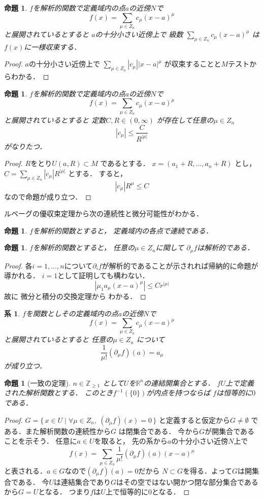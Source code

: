 \documentclass[leqno, a4paper, 12pt]{jsarticle}
\newtheorem{prop}[thm]{命題}
\newtheorem{cor}[thm]{系}
\newcommand{\zz}{\mathbb{Z}}
\newcommand{\rr}{\mathbb{R}}
\begin{document}
\begin{prop}
$f$を解析的関数で定義域内の点$a$の近傍$N$で
\[
f(x)=\sum_{\mu\in Z_n}c_{\mu}(x-a)^{\mu}
\]
と展開されているとすると
$a$の十分小さい近傍上で
級数
$\sum_{\mu\in Z_n}c_{\mu}(x-a)^{\mu}
$
は$f(x)$に一様収束する．
\end{prop}
\begin{proof}
$a$の十分小さい近傍上で
$\sum_{\mu\in Z_n}|c_{\mu}||x-a|^{\mu}$
が収束することと$M$テストからわかる．
\end{proof}



\begin{prop}
$f$を解析的関数で定義域内の点$a$の近傍$N$で
\[
f(x)=\sum_{\mu\in Z_n}c_{\mu}(x-a)^{\mu}
\]
と展開されているとすると
定数$C, R\in (0, \infty)$
が存在して任意の$\mu\in Z_n$
\[
|c_{\mu}|\le \frac{C}{R^{|\mu|}}
\]
がなりたつ．
\end{prop}
\begin{proof}
$R$をとり$U(a, R)\subset M$
であるとする．
$x=(a_1+R, \dots, a_n+R)$
とし，
$C=\sum_{\mu\in Z_n}|c_{\mu}|R^{|\mu|}$
とする．
すると，
\[
|c_{\mu}|R^{\mu}\le C
\]
なので命題が成り立つ．
\end{proof}

ルベーグの優収束定理から次の連続性と微分可能性がわかる．
\begin{prop}
$f$を解析的関数とすると，
定義域内の各点で連続である．
\end{prop}
\begin{prop}
$f$を解析的関数とすると，
任意の$\mu\in Z_n$に関して
$\partial_{\mu}f$は解析的である．
\end{prop}
\begin{proof}
各$i=1, \dots, n$について$\partial_{i}f$が解析的であることが示されれば帰納的に命題が導かれる．
$i=1$として証明しても構わない．
\[
|\mu_1a_{\mu}(x-a)^{\mu}|\le Cr^{|\mu|}
\]
故に
微分と積分の交換定理から
わかる．
\end{proof}

\begin{cor}
$f$を関数としその定義域内の点$a$の近傍$N$で
\[
f(x)=\sum_{\mu\in Z_n}c_{\mu}(x-a)^{\mu}
\]
と展開されているとすると
任意の$\mu\in Z_n$
について
\[
\frac{1}{\mu!}(\partial_{\mu}f)(a)=a_{\mu}
\]
が成り立つ．
\end{cor}

\begin{prop}[一致の定理]
$n\in \zz_{\ge 1}$
として$U$を$\rr^{n}$の連結開集合とする．
$f$$U$上で定義された解析関数とする．
このとき$f^{-1}(\{0\})$が内点を持つならば
$f$は恒等的に$0$である．
\end{prop}
\begin{proof}
$G=\{\, 
x\in U
\mid 
\forall \mu\in Z_{n}, \ 
(\partial_{\mu}f)(x)=0
\, \}$
と定義すると仮定から$G\neq \emptyset$
である．また解析関数の連続性から$G$
は閉集合である．
今から$G$が開集合であることを示そう．
任意に$a\in U$を取ると，
先の系から$a$の十分小さい近傍$N$上で
\[
f(x)=\sum_{\mu\in Z_n}\frac{1}{\mu!}(\partial_{\mu}f)(a)(x-a)^{\mu}
\]
と表される．$a\in G$なので$(\partial_{\mu}f)(a)=0$だから
$N\subset G$を得る．よって$G$は開集合である．
今$U$は連結集合であり$G$はその空ではない開かつ閉な部分集合であるから$G=U$となる．
つまり$f$は$U$上で恒等的に$0$となる．
\end{proof}
\end{document}
